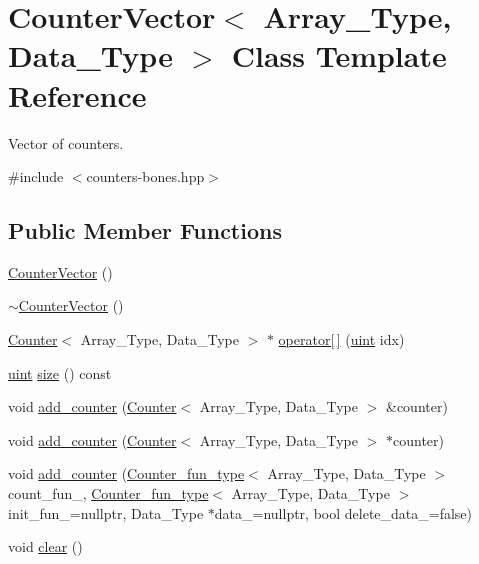 \hypertarget{class_counter_vector}{}\section{Counter\+Vector$<$ Array\+\_\+\+Type, Data\+\_\+\+Type $>$ Class Template Reference}
\label{class_counter_vector}


Vector of counters.  




{\ttfamily \#include $<$counters-\/bones.\+hpp$>$}

\subsection*{Public Member Functions}
\begin{DoxyCompactItemize}
\item 
\hyperlink{class_counter_vector_a536074f2ce013785e547a7bc30bc1942}{Counter\+Vector} ()
\item 
\hyperlink{class_counter_vector_ac6fc360b2df296630fb2614836dd74af}{$\sim$\+Counter\+Vector} ()
\item 
\hyperlink{class_counter}{Counter}$<$ Array\+\_\+\+Type, Data\+\_\+\+Type $>$ $\ast$ \hyperlink{class_counter_vector_a6eac3e73298e1e6d424b92f324ffe9a8}{operator\mbox{[}$\,$\mbox{]}} (\hyperlink{typedefs_8hpp_a91ad9478d81a7aaf2593e8d9c3d06a14}{uint} idx)
\item 
\hyperlink{typedefs_8hpp_a91ad9478d81a7aaf2593e8d9c3d06a14}{uint} \hyperlink{class_counter_vector_affee3825ee1b1ce01b926f443c67f585}{size} () const
\item 
void \hyperlink{class_counter_vector_a34fda06ff678691daf3b0455c1a2af48}{add\+\_\+counter} (\hyperlink{class_counter}{Counter}$<$ Array\+\_\+\+Type, Data\+\_\+\+Type $>$ \&counter)
\item 
void \hyperlink{class_counter_vector_a062d52e18f1d3ba4c00cbf4c2d89f1e7}{add\+\_\+counter} (\hyperlink{class_counter}{Counter}$<$ Array\+\_\+\+Type, Data\+\_\+\+Type $>$ $\ast$counter)
\item 
void \hyperlink{class_counter_vector_adb32ff1af45bc05a292a5cb064dc414d}{add\+\_\+counter} (\hyperlink{typedefs_8hpp_ac0160f52f564dea3ac033b374cffbfe7}{Counter\+\_\+fun\+\_\+type}$<$ Array\+\_\+\+Type, Data\+\_\+\+Type $>$ count\+\_\+fun\+\_\+, \hyperlink{typedefs_8hpp_ac0160f52f564dea3ac033b374cffbfe7}{Counter\+\_\+fun\+\_\+type}$<$ Array\+\_\+\+Type, Data\+\_\+\+Type $>$ init\+\_\+fun\+\_\+=nullptr, Data\+\_\+\+Type $\ast$data\+\_\+=nullptr, bool delete\+\_\+data\+\_\+=false)
\item 
void \hyperlink{class_counter_vector_acce75748f917e3a7898d49a23df996e7}{clear} ()
\end{DoxyCompactItemize}


